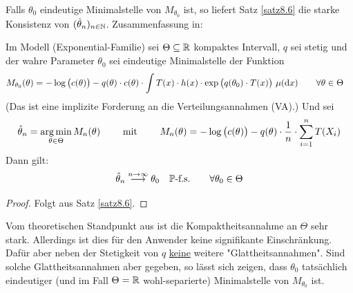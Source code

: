 
Falls $\theta_0$ eindeutige Minimalstelle von $M_{\theta_0}$ ist, so liefert Satz \ref{satz8.6} die starke Konsistenz von $(\hat{\theta}_n)_{n\in\N}$.
Zusammenfassung in:

\begin{satz}\label{satz8.7}
	 Im Modell (Exponential-Familie) sei $\Theta\subseteq\R$ kompaktes Intervall,
	 $q$ sei stetig und der wahre Parameter $\theta_0$ sei eindeutige Minimalstelle der Funktion
	 \begin{align*}
	 	M_{\theta_0}(\theta)
	 	&=-\log\big(c(\theta)\big)-q(\theta)\cdot c(\theta)\cdot\int\limits T(x)\cdot h(x)\cdot\exp\big(q(\theta_0)\cdot T(x)\big)~\mu(\d x)
	 	\qquad\forall\theta\in\Theta
	 \end{align*}
	 (Das ist eine implizite Forderung an die Verteilungsannahmen (VA).)
	 Und sei 
	 \begin{align*}
	 	\hat{\theta}_n=\argmin\limits_{\theta\in\Theta} M_n(\theta)
	 	\qquad\mit\qquad
	 	M_n(\theta)=-\log\big(c(\theta)\big)-q(\theta)\cdot\frac{1}{n}\cdot\sum\limits_{i=1}^n T(X_i)
	 \end{align*}
	 Dann gilt:
	 \begin{align*}
	 	\hat{\theta}_n\overset{n\to\infty}{\longrightarrow}
	 	\theta_0\quad\P\text{-f.s.}\qquad\forall\theta_0\in\Theta
	 \end{align*}
\end{satz}

\begin{proof}
	Folgt aus Satz \ref{satz8.6}.
\end{proof}


Vom theoretischen Standpunkt aus ist die Kompaktheitsannahme an $\Theta$ sehr stark.
Allerdings ist dies für den Anwender keine signifikante Einschränkung.
Dafür aber neben der Stetigkeit von $q$ \underline{keine} weitere "Glattheitsannahmen".
Sind solche Glattheitsannahmen aber gegeben, so lässt sich zeigen, dass $\theta_0$ tatsächlich eindeutiger (und im Fall $\Theta=\R$ wohl-separierte) Minimalstelle von $M_{\theta_0}$ ist. 

